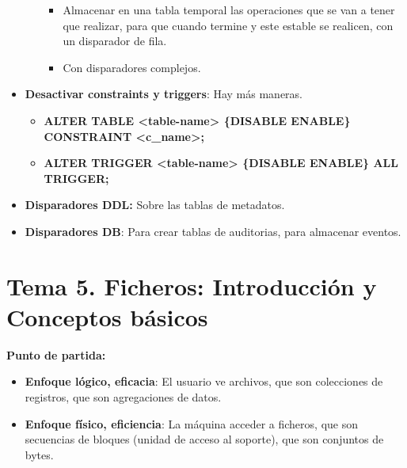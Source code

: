 \documentclass[12pt, twoside, openright]{report} %
\begin{document}
\begin{itemize}
\begin{itemize}
      \begin{itemize}
      \item Almacenar en una tabla temporal las operaciones que se van a
        tener que realizar, para que cuando termine y este estable se
        realicen, con un disparador de fila.
        
      \item Con disparadores complejos.
        
      \end{itemize}
    \end{itemize}
  \item \textbf{Desactivar constraints y triggers}: Hay más maneras.
    

    \begin{itemize}
    \item \textbf{ALTER TABLE \textless table-name\textgreater{} \{DISABLE
      \textbar{} ENABLE\} CONSTRAINT \textless c\_name\textgreater;}
      
    \item \textbf{ALTER TRIGGER \textless table-name\textgreater{} \{DISABLE
      \textbar{} ENABLE\} ALL TRIGGER;}
      
    \end{itemize}
  \item \textbf{Disparadores DDL:} Sobre las tablas de metadatos.
    
  \item \textbf{Disparadores DB}: Para crear tablas de auditorias, para
    almacenar eventos.
    
  \end{itemize}

  
\chapter{Tema 5. Ficheros: Introducción y Conceptos básicos}



  
  \textbf{Punto de partida:}
  

  \begin{itemize}
  \item \textbf{Enfoque lógico, eficacia}: El usuario ve archivos, que son
    colecciones de registros, que son agregaciones de datos.
    
  \item \textbf{Enfoque físico, eficiencia}: La máquina acceder a ficheros,
    que son secuencias de bloques (unidad de acceso al soporte), que son
    conjuntos de bytes.
    
  \end{itemize}
\end{document}
